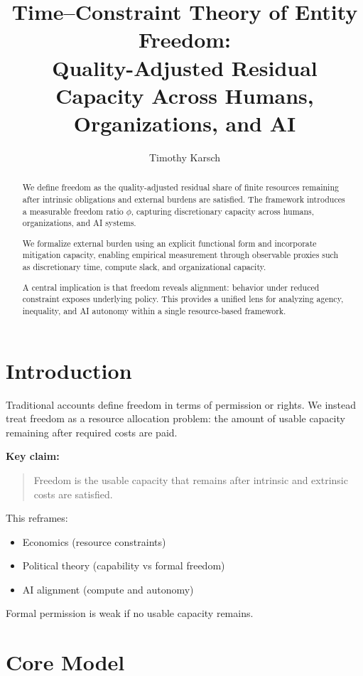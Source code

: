 \documentclass[11pt]{article}
\title{Time--Constraint Theory of Entity Freedom:\\
Quality-Adjusted Residual Capacity Across Humans, Organizations, and AI}
\author{Timothy Karsch}
\date{}
\begin{document}
\maketitle

\begin{abstract}
We define freedom as the quality-adjusted residual share of finite resources remaining after intrinsic obligations and external burdens are satisfied. The framework introduces a measurable freedom ratio $\phi$, capturing discretionary capacity across humans, organizations, and AI systems. 

We formalize external burden using an explicit functional form and incorporate mitigation capacity, enabling empirical measurement through observable proxies such as discretionary time, compute slack, and organizational capacity. 

A central implication is that freedom reveals alignment: behavior under reduced constraint exposes underlying policy. This provides a unified lens for analyzing agency, inequality, and AI autonomy within a single resource-based framework.
\end{abstract}

\section{Introduction}

Traditional accounts define freedom in terms of permission or rights. We instead treat freedom as a resource allocation problem: the amount of usable capacity remaining after required costs are paid.

\textbf{Key claim:}
\begin{quote}
Freedom is the usable capacity that remains after intrinsic and extrinsic costs are satisfied.
\end{quote}

This reframes:
\begin{itemize}
\item Economics (resource constraints)
\item Political theory (capability vs formal freedom)
\item AI alignment (compute and autonomy)
\end{itemize}

Formal permission is weak if no usable capacity remains.

\section{Core Model}
\end{document}
